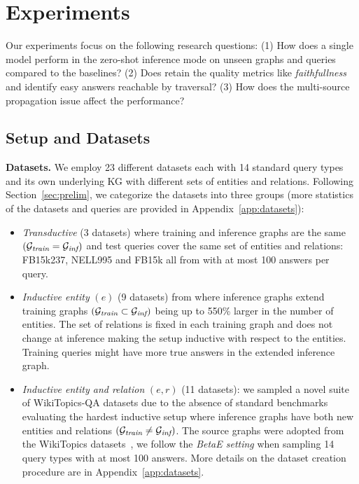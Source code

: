 \section{Experiments}
\label{sec:experiments}

Our experiments focus on the following research questions: (1) How does a single \method model perform in the zero-shot inference mode on unseen graphs and queries compared to the baselines? (2) Does \method retain the quality metrics like \emph{faithfullness} and identify easy answers reachable by traversal? (3) How does the multi-source propagation issue affect the performance?

\subsection{Setup and Datasets}

\textbf{Datasets.} 
We employ 23 different \clqa datasets each with 14 standard query types and its own underlying KG with different sets of entities and relations. Following Section~\ref{sec:prelim}, we categorize the datasets into three groups (more statistics of the datasets and queries are provided in Appendix~\ref{app:datasets}):
\begin{itemize}[leftmargin=*]
    \item \emph{Transductive} (3 datasets) where training and inference graphs are the same $(\mathcal{G}_{\textit{train}} = \mathcal{G}_{\textit{inf}})$ and test queries cover the same set of entities and relations: FB15k237, NELL995 and FB15k all from \citet{betae} with at most 100 answers per query.
    \item \emph{Inductive entity} $(e)$ (9 datasets) from \citet{galkin2022} where inference graphs extend training graphs $(\mathcal{G}_{\textit{train}} \subset \mathcal{G}_{\textit{inf}})$ being up to 550\% larger in the number of entities. The set of relations is fixed in each training graph and does not change at inference making the setup inductive with respect to the entities. Training queries might have more true answers in the extended inference graph.
    \item \emph{Inductive entity and relation} $(e,r)$ (11 datasets): we sampled a novel suite of WikiTopics-QA datasets due to the absence of standard benchmarks evaluating the hardest inductive setup where inference graphs have both new entities and relations $(\mathcal{G}_{\textit{train}} \neq \mathcal{G}_{\textit{inf}})$. The source graphs were adopted from the WikiTopics datasets~\citep{isdea}, we follow the \emph{BetaE setting} when sampling 14 query types with at most 100 answers. More details on the dataset creation procedure are in Appendix~\ref{app:datasets}. 
\end{itemize} 

